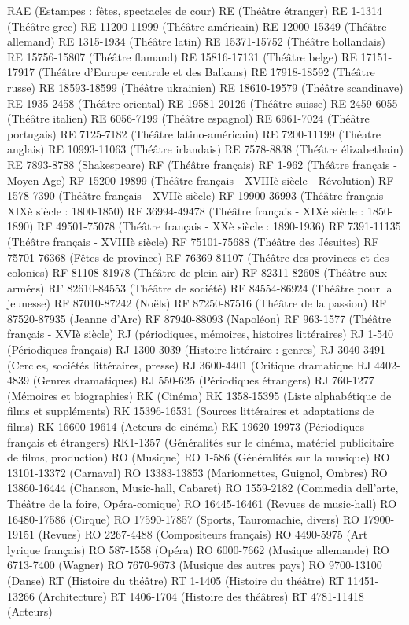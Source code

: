 \documentclass[12pt,twoside]{book}
\begin{document}
RAE (Estampes : fêtes, spectacles de cour)
RE (Théâtre étranger)
RE 1-1314 (Théâtre grec)
RE 11200-11999 (Théâtre américain)
RE 12000-15349 (Théâtre allemand)
RE 1315-1934 (Théâtre latin)
RE 15371-15752 (Théâtre hollandais)
RE 15756-15807 (Théâtre flamand)
RE 15816-17131 (Théâtre belge)
RE 17151-17917 (Théâtre d'Europe centrale et des Balkans)
RE 17918-18592 (Théâtre russe)
RE 18593-18599 (Théâtre ukrainien)
RE 18610-19579 (Théâtre scandinave)
RE 1935-2458 (Théâtre oriental)
RE 19581-20126 (Théâtre suisse)
RE 2459-6055 (Théâtre italien)
RE 6056-7199 (Théâtre espagnol)
RE 6961-7024 (Théâtre portugais)
RE 7125-7182 (Théâtre latino-américain)
RE 7200-11199 (Théatre anglais)
RE 10993-11063 (Théâtre irlandais)
RE 7578-8838 (Théâtre élizabethain)
RE 7893-8788 (Shakespeare)
RF (Théâtre français)
RF 1-962 (Théâtre français - Moyen Age)
RF 15200-19899 (Théâtre français - XVIIIè siècle - Révolution)
RF 1578-7390 (Théâtre français - XVIIè siècle)
RF 19900-36993 (Théâtre français - XIXè siècle : 1800-1850)
RF 36994-49478 (Théâtre français - XIXè siècle : 1850-1890)
RF 49501-75078 (Théâtre français - XXè siècle : 1890-1936)
RF 7391-11135 (Théâtre français - XVIIIè siècle)
RF 75101-75688 (Théâtre des Jésuites)
RF 75701-76368 (Fêtes de province)
RF 76369-81107 (Théâtre des provinces et des colonies)
RF 81108-81978 (Théâtre de plein air)
RF 82311-82608 (Théâtre aux armées)
RF 82610-84553 (Théâtre de société)
RF 84554-86924 (Théâtre pour la jeunesse)
RF 87010-87242 (Noëls)
RF 87250-87516 (Théâtre de la passion)
RF 87520-87935 (Jeanne d'Arc)
RF 87940-88093 (Napoléon)
RF 963-1577 (Théâtre français - XVIè siècle)
RJ (périodiques, mémoires, histoires littéraires)
RJ 1-540 (Périodiques français)
RJ 1300-3039 (Histoire littéraire : genres)
RJ 3040-3491 (Cercles, sociétés littéraires, presse)
RJ 3600-4401 (Critique dramatique
RJ 4402-4839 (Genres dramatiques)
RJ 550-625 (Périodiques étrangers)
RJ 760-1277 (Mémoires et biographies)
RK (Cinéma)
RK 1358-15395 (Liste alphabétique de films et suppléments)
RK 15396-16531 (Sources littéraires et adaptations de films)
RK 16600-19614 (Acteurs de cinéma)
RK 19620-19973 (Périodiques français et étrangers)
RK1-1357 (Généralités sur le cinéma, matériel publicitaire de films, production)
RO (Musique)
RO 1-586 (Généralités sur la musique)
RO 13101-13372 (Carnaval)
RO 13383-13853 (Marionnettes, Guignol, Ombres)
RO 13860-16444 (Chanson, Music-hall, Cabaret)
RO 1559-2182 (Commedia dell'arte, Théâtre de la foire, Opéra-comique)
RO 16445-16461 (Revues de music-hall)
RO 16480-17586 (Cirque)
RO 17590-17857 (Sports, Tauromachie, divers)
RO 17900-19151 (Revues)
RO 2267-4488 (Compositeurs français)
RO 4490-5975 (Art lyrique français)
RO 587-1558 (Opéra)
RO 6000-7662 (Musique allemande)
RO 6713-7400 (Wagner)
RO 7670-9673 (Musique des autres pays)
RO 9700-13100 (Danse)
RT (Histoire du théâtre)
RT 1-1405 (Histoire du théâtre)
RT 11451-13266 (Architecture)
RT 1406-1704 (Histoire des théâtres)
RT 4781-11418 (Acteurs)
\end{document}
